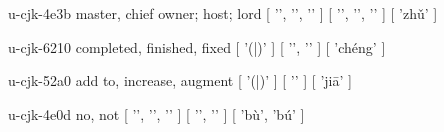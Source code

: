 \begin{multicols}{2}
\lettrine[lines=3]{\cjkgGlue{}}{}\begin{minipage}{0.8\linewidth} u-cjk-4e3b  master, chief owner; host; lord  [ '\cjkgGlue{}', '\cjkgGlue{}', '\cjkgGlue{}' ]  [ '\cjkgGlue{}', '\cjkgGlue{}', '\cjkgGlue{}' ]  [ 'zhǔ' ] \end{minipage}

\lettrine[lines=3]{\cjkgGlue{}}{}\begin{minipage}{0.8\linewidth} u-cjk-6210  completed, finished, fixed  [ '\cjkgGlue{}(\cjkgGlue{}|\cjkgGlue{})' ]  [ '\cjkgGlue{}', '\cjkgGlue{}' ]  [ 'chéng' ] \end{minipage}

\lettrine[lines=3]{\cjkgGlue{}}{}\begin{minipage}{0.8\linewidth} u-cjk-52a0  add to, increase, augment  [ '\cjkgGlue{}(\cjkgGlue{}|\cjkgGlue{})' ]  [ '\cjkgGlue{}' ]  [ 'jiā' ] \end{minipage}

\lettrine[lines=3]{\cjkgGlue{}}{}\begin{minipage}{0.8\linewidth} u-cjk-4e0d  no, not  [ '\cjkgGlue{}', '\cjkgGlue{}', '\cjkgGlue{}' ]  [ '\cjkgGlue{}', '\cjkgGlue{}' ]  [ 'bù', 'bú' ] \end{minipage}


\end{multicols}
